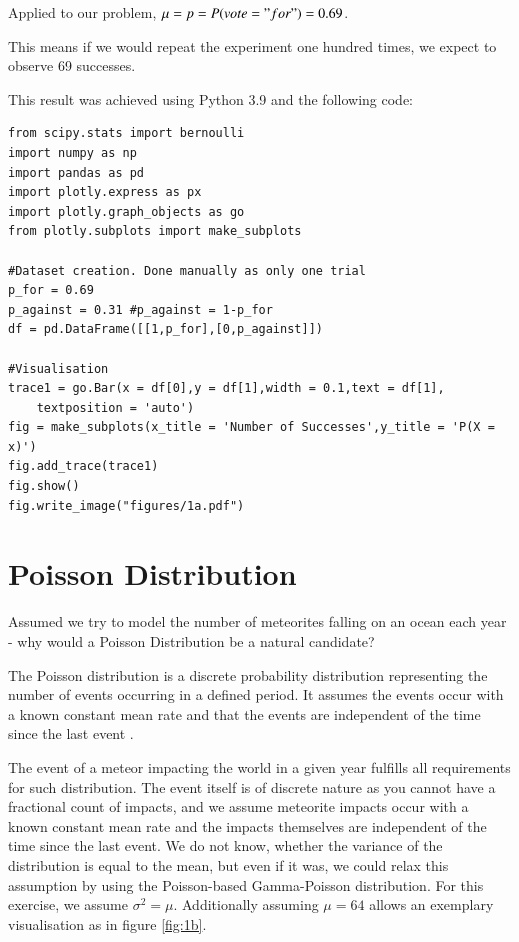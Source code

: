 Applied to our problem,  $ \mu = p = P(vote = "for") = 0.69 $.

This means if we would repeat the experiment one hundred times, we expect to observe 69 successes. 


This result was achieved using Python 3.9 and the following code:

\begin{verbatim}
from scipy.stats import bernoulli
import numpy as np
import pandas as pd
import plotly.express as px
import plotly.graph_objects as go
from plotly.subplots import make_subplots

#Dataset creation. Done manually as only one trial
p_for = 0.69
p_against = 0.31 #p_against = 1-p_for
df = pd.DataFrame([[1,p_for],[0,p_against]])

#Visualisation
trace1 = go.Bar(x = df[0],y = df[1],width = 0.1,text = df[1], 
    textposition = 'auto')
fig = make_subplots(x_title = 'Number of Successes',y_title = 'P(X = x)')
fig.add_trace(trace1)
fig.show()
fig.write_image("figures/1a.pdf")
\end{verbatim}

\section{Poisson Distribution}

Assumed we try to model the number of meteorites falling on an ocean each year - why would a Poisson Distribution be a natural candidate?


The Poisson distribution is a discrete probability distribution representing the number of events occurring in a defined period. It assumes the events occur with a known constant mean rate and that the events are independent of the time since the last event \cite[Chapter~4.6]{illowsky2018introductory}.

The event of a meteor impacting the world in a given year fulfills all requirements for such distribution. The event itself is of discrete nature as you cannot have a fractional count of impacts, and we assume meteorite impacts occur with a known constant mean rate and the impacts themselves are independent of the time since the last event. We do not know, whether the variance of the distribution is equal to the mean, but even if it was, we could relax this assumption by using the Poisson-based Gamma-Poisson distribution. For this exercise, we assume $\sigma^2 = \mu$. Additionally assuming $\mu = 64$ allows an exemplary visualisation as in figure \eqref{fig:1b}.

